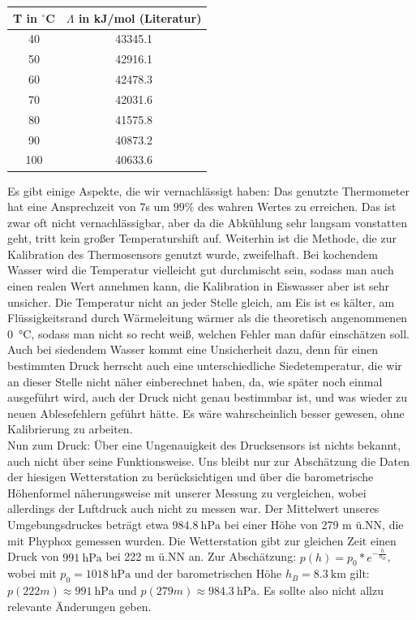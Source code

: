 \documentclass[]{article}
\begin{document}
	\begin{center}
		
		\begin{tabular}{|c|c|}
			\hline
			T in $^\circ$C &  $\Lambda$ in kJ/mol (Literatur)\\
			\hline
			\hline
			40 & 43345.1\\
			\hline
			50  & 42916.1\\
			\hline
			60 & 42478.3\\
			\hline
			70 & 42031.6\\
			\hline
			80 & 41575.8\\
			\hline
			90 & 40873.2\\
			\hline
			100 & 40633.6\\
			\hline  			
		\end{tabular} 
	\end{center}
	Es gibt einige Aspekte, die wir vernachlässigt haben:
	Das genutzte Thermometer hat eine Ansprechzeit von 7s um $99\%$ des wahren Wertes zu erreichen. Das ist zwar oft nicht vernachlässigbar, aber da die Abkühlung sehr langsam vonstatten geht, tritt kein großer Temperaturshift auf.
	Weiterhin ist die Methode, die zur Kalibration des Thermosensors genutzt wurde, zweifelhaft. Bei kochendem Wasser wird die Temperatur vielleicht gut durchmischt sein, sodass man auch einen realen Wert annehmen kann, die Kalibration in Eiswasser aber ist sehr unsicher. Die Temperatur nicht an jeder Stelle gleich, am Eis ist es kälter, am Flüssigkeitsrand durch Wärmeleitung wärmer als die theoretisch angenommenen \SI{0}{\celsius}, sodass man nicht so recht weiß, welchen Fehler man dafür einschätzen soll. Auch bei siedendem Wasser kommt eine Unsicherheit dazu, denn für einen bestimmten Druck herrscht auch eine unterschiedliche Siedetemperatur, die wir an dieser Stelle nicht näher einberechnet haben, da, wie später noch einmal ausgeführt wird, auch der Druck nicht genau bestimmbar ist, und was wieder zu neuen Ablesefehlern geführt hätte.
	Es wäre wahrscheinlich besser gewesen, ohne Kalibrierung zu arbeiten.\\
	Nun zum Druck: Über eine Ungenauigkeit des Drucksensors ist nichts bekannt, auch nicht über seine Funktionsweise. Uns bleibt nur zur Abschätzung die Daten der hiesigen Wetterstation zu berücksichtigen und über die barometrische Höhenformel näherungsweise mit unserer Messung zu vergleichen, wobei allerdings der Luftdruck auch nicht zu messen war. Der Mittelwert unseres Umgebungsdruckes beträgt etwa $\SI{984.8}{\hecto \pascal}$ bei einer Höhe von 279 m ü.NN, die mit Phyphox gemessen wurden. Die Wetterstation gibt zur gleichen Zeit einen Druck von $\SI{991}{\hecto \pascal}$ bei 222 m ü.NN an. Zur Abschätzung: $p(h)=p_0*e^{-\frac{h}{h_B}}$, wobei mit $p_0=\SI{1018}{\hecto \pascal}$ und der barometrischen Höhe $h_B=\SI{8.3}{\kilo \meter}$ gilt: $p(222m) \approx \SI{991}{\hecto \pascal}$ und $p(279m) \approx \SI{984.3}{\hecto \pascal}$. Es sollte also nicht allzu relevante Änderungen geben.\\
\end{document}
